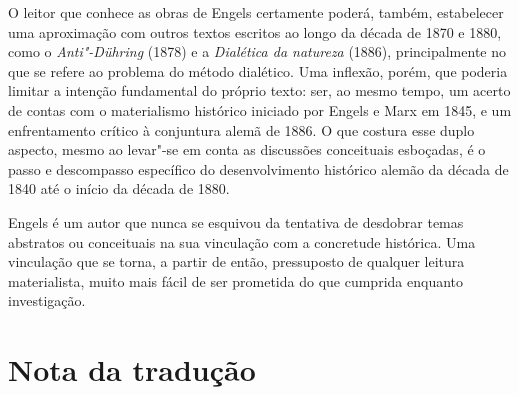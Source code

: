 O leitor que conhece as obras de Engels certamente poderá,
também, estabelecer uma aproximação com outros textos escritos ao longo
da década de 1870 e 1880, como o \emph{Anti"-Dühring} (1878) e a
\emph{Dialética da natureza} (1886), principalmente no que se refere ao
problema do método dialético. Uma inflexão, porém, que poderia limitar a
intenção fundamental do próprio texto: ser, ao mesmo tempo,
um acerto de contas com o materialismo histórico iniciado por Engels e
Marx em 1845, e um enfrentamento crítico à conjuntura alemã de 1886. O
que costura esse duplo aspecto, mesmo ao levar"-se em conta as discussões
conceituais esboçadas, é o passo e descompasso específico do
desenvolvimento histórico alemão da década de 1840 até o início da década de 1880.

Engels é um autor que nunca se esquivou da tentativa de desdobrar temas
abstratos ou conceituais na sua vinculação com a concretude histórica.
Uma vinculação que se torna, a partir de então, pressuposto de qualquer
leitura materialista, muito mais fácil de ser prometida do que cumprida
enquanto investigação.

\pagebreak
\section*{Nota da tradução}

